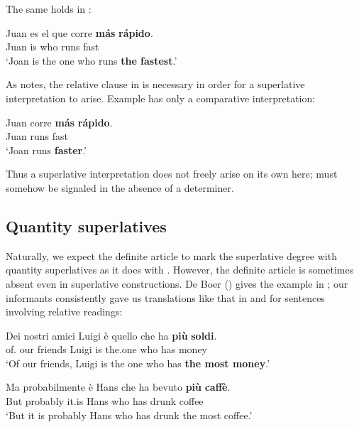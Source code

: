\documentclass[output=paper
,modfonts
,nonflat]{langsci/langscibook}
\begin{document}
The same holds in :

\ea \label{ex:coppockstrand:62}
\gll Juan es el que corre \textbf{m\'as} \textbf{r\'apido}.\\
Juan is  who runs \cmpr{} fast\\ 
\glt`Joan is the one who runs \textbf{the fastest}.' \citep[1--2]{Rohena-Madrazo2007}
\z

As \citet{Rohena-Madrazo2007} notes, the relative clause in  is necessary in order for a superlative interpretation to arise. Example  has only a comparative interpretation:

\ea \label{ex:coppockstrand:63}
\gll Juan corre \textbf{m\'as} \textbf{r\'apido}.\\
Juan  runs \cmpr{} fast\\ 
\glt `Joan runs \textbf{faster}.'
\z

Thus a superlative interpretation does not freely arise on its own here;  must somehow be signaled in the absence of a determiner.

\subsection{Quantity superlatives}

Naturally, we expect the definite article to mark the superlative degree with quantity superlatives as it does with . However, the definite article is sometimes absent even in superlative constructions. De Boer (\citeyear[53]{deBoer1986}) gives the example in ; our informants consistently gave us translations like that in  and  for sentences involving relative readings:

\ea \label{ex:coppockstrand:64}
\gll Dei nostri amici Luigi \`e quello che ha \textbf{pi\`u} \textbf{soldi}.\\
of. our friends Luigi is the.one who has \cmpr{} money\\ 
\glt `Of our friends, Luigi is the one who has \textbf{the most money}.'
\z
  
\ea \label{ex:coppockstrand:65}
\gll Ma probabilmente è Hans che ha bevuto \textbf{più} \textbf{caffè}.\\
But probably it.is Hans who has drunk \cmpr{} coffee\\ 
\glt `But it is probably Hans who has drunk the most coffee.'
\z
\end{document}
